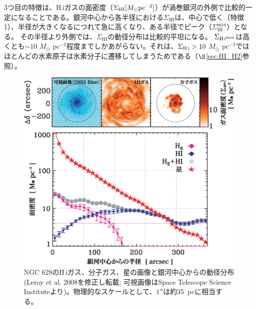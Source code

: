3つ目の特徴は、H\,{\sc i}ガスの面密度（$\Sigma_{{\rm HI}} [M_\odot \mbox{pc}^{-2}]$）が渦巻銀河の外側で比較的一定になることである。銀河中心から各半径における$\Sigma_{\text{HI}}$は、中心で低く（特徴1）、半径が大きくなるにつれて急に高くなり、ある半径でピーク（$\Sigma_{\text{HI}}^{\text{max}}$）となる。
その半径より外側では、$\Sigma_{\text{HI}}$の動径分布は比較的平坦になる\citep[e.g.,][図\ref{fig:leroy}下参照]{2008AJ....136.2782L, 2012ApJ...756..183B}。
$\Sigma_{\text{H\,{\sc i}}^{\text{max}}}$は高くとも$\sim10$ $M_\odot$ pc$^{-2}$程度までしかあがらない。それは、$\Sigma_{\text{H\,{\sc i}}}>10$ $M_\odot$ pc$^{-2}$ではほとんどの水素原子は水素分子に遷移してしまうためである（$\S$\ref{sec:HI_H2}参照）。

\begin{figure}[t]
\begin{center}
\includegraphics[width=12cm]{galaxy/Leroy08.eps}
\end{center}
\caption{NGC 628のH\,{\sc i}ガス、分子ガス、星の画像と銀河中心からの動径分布(Leroy et al. 2008を修正し転載; 可視画像はSpace Telescope Science Instituteより)。物理的なスケールとして、$1''$は約35~pcに相当する。}
\vspace{1\baselineskip}
\label{fig:leroy}
\end{figure}


